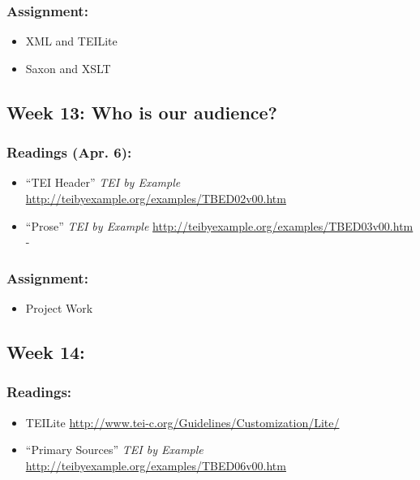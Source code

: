 \documentclass[]{article}
\begin{document}
\subsubsection{Assignment:}\label{assignment-10}

\begin{itemize}
\itemsep1pt\parskip0pt
\item
  XML and TEILite
\item
  Saxon and XSLT
\end{itemize}

\subsection{Week 13: Who is our
audience?}\label{week-13-who-is-our-audience}

\subsubsection{Readings (Apr. 6):}\label{readings-apr.-6}

\begin{itemize}
\itemsep1pt\parskip0pt
\item
  ``TEI Header'' \emph{TEI by Example}
  \url{http://teibyexample.org/examples/TBED02v00.htm}
\item
  ``Prose'' \emph{TEI by Example}
  \url{http://teibyexample.org/examples/TBED03v00.htm} -
\end{itemize}

\subsubsection{Assignment:}\label{assignment-11}

\begin{itemize}
\itemsep1pt\parskip0pt
\item
  Project Work
\end{itemize}

\subsection{Week 14:}\label{week-14}

\subsubsection{Readings:}\label{readings}

\begin{itemize}
\itemsep1pt\parskip0pt
\item
  TEILite \url{http://www.tei-c.org/Guidelines/Customization/Lite/}
\item
  ``Primary Sources'' \emph{TEI by Example}
  \url{http://teibyexample.org/examples/TBED06v00.htm}
\end{itemize}
\end{document}
